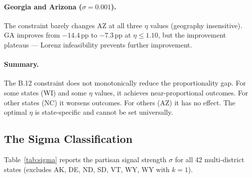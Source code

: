 \paragraph{Georgia and Arizona ($\sigma = 0.001$).}
The constraint barely changes AZ at all three $\eta$ values (geography insensitive).
GA improves from $-14.4$\,pp to $-7.3$\,pp at $\eta \leq 1.10$, but the improvement
plateaus --- Lorenz infeasibility prevents further improvement.

\paragraph{Summary.}
The B.12 constraint does not monotonically reduce the proportionality gap.
For some states (WI) and some $\eta$ values, it achieves near-proportional outcomes.
For other states (NC) it worsens outcomes.
For others (AZ) it has no effect.
The optimal $\eta$ is state-specific and cannot be set universally.

\subsection{The Sigma Classification}

Table~\ref{tab:sigma} reports the partisan signal strength $\sigma$ for
all 42 multi-district states (excludes AK, DE, ND, SD, VT, WY, WY with $k=1$).

